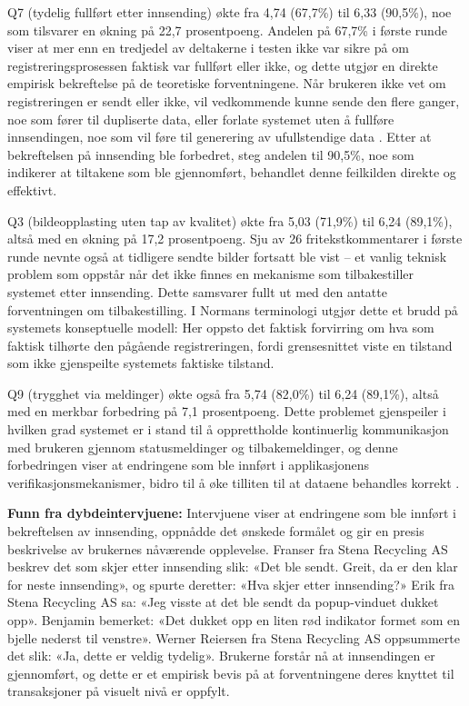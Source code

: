 \newline 
Q7 (tydelig fullført etter innsending) økte fra 4,74 (67,7\%) til 6,33 (90,5\%), noe som tilsvarer en økning på 22,7 prosentpoeng. Andelen på 67,7\% i første runde viser at mer enn en tredjedel av deltakerne i testen ikke var sikre på om registreringsprosessen faktisk var fullført eller ikke, og dette utgjør en direkte empirisk bekreftelse på de teoretiske forventningene. Når brukeren ikke vet om registreringen er sendt eller ikke, vil vedkommende kunne sende den flere ganger, noe som fører til dupliserte data, eller forlate systemet uten å fullføre innsendingen, noe som vil føre til generering av ufullstendige data \cite{wang1996}. Etter at bekreftelsen på innsending ble forbedret, steg andelen til 90,5\%, noe som indikerer at tiltakene som ble gjennomført, behandlet denne feilkilden direkte og effektivt.

\newline 
Q3 (bildeopplasting uten tap av kvalitet) økte fra 5,03 (71,9\%) til 6,24 (89,1\%), altså med en økning på 17,2 prosentpoeng. Sju av 26 fritekstkommentarer i første runde nevnte også at tidligere sendte bilder fortsatt ble vist – et vanlig teknisk problem som oppstår når det ikke finnes en mekanisme som tilbakestiller systemet etter innsending. Dette samsvarer fullt ut med den antatte forventningen om tilbakestilling. I Normans terminologi \cite{norman2013} utgjør dette et brudd på systemets konseptuelle modell: Her oppsto det faktisk forvirring om hva som faktisk tilhørte den pågående registreringen, fordi grensesnittet viste en tilstand som ikke gjenspeilte systemets faktiske tilstand.

\newline 
Q9 (trygghet via meldinger) økte også fra 5,74 (82,0\%) til 6,24 (89,1\%), altså med en merkbar forbedring på 7,1 prosentpoeng. Dette problemet gjenspeiler i hvilken grad systemet er i stand til å opprettholde kontinuerlig kommunikasjon med brukeren gjennom statusmeldinger og tilbakemeldinger, og denne forbedringen viser at endringene som ble innført i applikasjonens verifikasjonsmekanismer, bidro til å øke tilliten til at dataene behandles korrekt \cite{wenz2023}.

\newline
\textbf{Funn fra dybdeintervjuene: }
Intervjuene viser at endringene som ble innført i bekreftelsen av innsending, oppnådde det ønskede formålet og gir en presis beskrivelse av brukernes nåværende opplevelse. Franser fra Stena Recycling AS beskrev det som skjer etter innsending slik: «Det ble sendt. Greit, da er den klar for neste innsending», og spurte deretter: «Hva skjer etter innsending?» Erik fra Stena Recycling AS sa: «Jeg visste at det ble sendt da popup-vinduet dukket opp». Benjamin bemerket: «Det dukket opp en liten rød indikator formet som en bjelle nederst til venstre». Werner Reiersen fra Stena Recycling AS oppsummerte det slik: «Ja, dette er veldig tydelig». Brukerne forstår nå at innsendingen er gjennomført, og dette er et empirisk bevis på at forventningene deres knyttet til transaksjoner på visuelt nivå er oppfylt.

